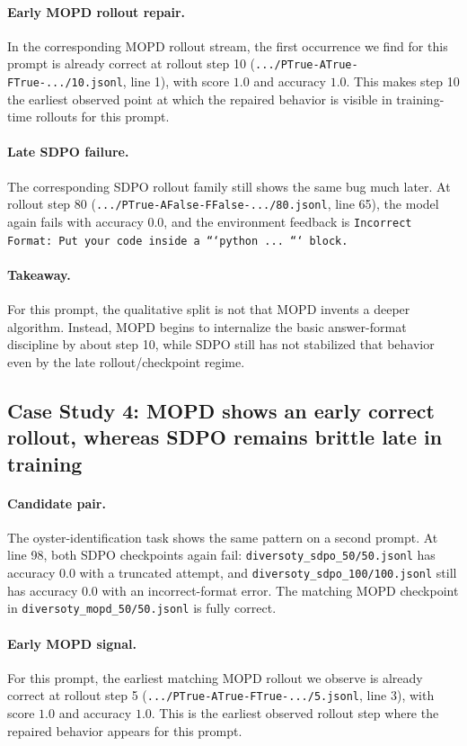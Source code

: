 \paragraph{Early MOPD rollout repair.}
In the corresponding MOPD rollout stream, the first occurrence we find for this
prompt is already correct at rollout step 10
(\texttt{.../PTrue-ATrue-FTrue-.../10.jsonl}, line 1), with score $1.0$ and
accuracy $1.0$.
This makes step 10 the earliest observed point at which the repaired behavior is
visible in training-time rollouts for this prompt.

\paragraph{Late SDPO failure.}
The corresponding SDPO rollout family still shows the same bug much later.
At rollout step 80
(\texttt{.../PTrue-AFalse-FFalse-.../80.jsonl}, line 65), the model again fails
with accuracy $0.0$, and the environment feedback is
\texttt{Incorrect Format: Put your code inside a ```python ... ``` block.}

\paragraph{Takeaway.}
For this prompt, the qualitative split is not that MOPD invents a deeper
algorithm.
Instead, MOPD begins to internalize the basic answer-format discipline by about
step 10, while SDPO still has not stabilized that behavior even by the late
rollout/checkpoint regime.

\subsection{Case Study 4: MOPD shows an early correct rollout, whereas SDPO remains brittle late in training}

\paragraph{Candidate pair.}
The oyster-identification task shows the same pattern on a second prompt.
At line 98, both SDPO checkpoints again fail:
\texttt{diversoty\_sdpo\_50/50.jsonl} has accuracy $0.0$ with a truncated
attempt, and \texttt{diversoty\_sdpo\_100/100.jsonl} still has accuracy $0.0$
with an incorrect-format error.
The matching MOPD checkpoint in
\texttt{diversoty\_mopd\_50/50.jsonl} is fully correct.

\paragraph{Early MOPD signal.}
For this prompt, the earliest matching MOPD rollout we observe is already
correct at rollout step 5
(\texttt{.../PTrue-ATrue-FTrue-.../5.jsonl}, line 3), with score $1.0$ and
accuracy $1.0$.
This is the earliest observed rollout step where the repaired behavior appears
for this prompt.

